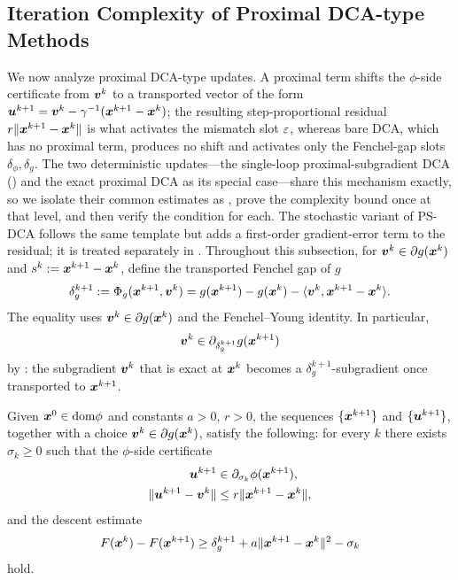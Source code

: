 \subsection{Iteration Complexity of Proximal DCA-type Methods}
\label{subsec:prox-subgrad-dca}
We now analyze proximal DCA-type updates. A proximal term shifts the
$\phi$-side certificate from $\bm{v}^k$ to a transported vector of the
form $\bm{u}^{k+1}=\bm{v}^k-\gamma^{-1}(\bm{x}^{k+1}-\bm{x}^k)$; the resulting
step-proportional residual $r\|\bm{x}^{k+1}-\bm{x}^k\|$ is what activates the
mismatch slot $\varepsilon$, whereas bare DCA, which has no proximal term,
produces no shift and activates only the Fenchel-gap slots
$\delta_\phi,\delta_g$. The two deterministic updates---the single-loop
proximal-subgradient DCA () and the exact proximal DCA
as its special case---share this mechanism exactly, so we isolate their
common estimates as , prove the
complexity bound once at that level, and then verify the condition for
each. The stochastic variant of PS-DCA follows the same template but
adds a first-order gradient-error term to the residual; it is treated
separately in .
Throughout this subsection, for
$\bm{v}^k\in\partial g(\bm{x}^k)$ and $s^k:=\bm{x}^{k+1}-\bm{x}^k$, define the
transported Fenchel gap of $g$
\begin{equation}
    \delta_g^{k+1}
    :=
    \Phi_g(\bm{x}^{k+1},\bm{v}^k)
    =
    g(\bm{x}^{k+1})-g(\bm{x}^k)
    -\langle \bm{v}^k,\bm{x}^{k+1}-\bm{x}^k\rangle .
    \label{eq:prox-dca-transport-g-gap}
\end{equation}
The equality uses $\bm{v}^k\in\partial g(\bm{x}^k)$ and the Fenchel--Young
identity. In particular,
\[
    \bm{v}^k\in\partial_{\delta_g^{k+1}} g(\bm{x}^{k+1})
\]
by : the subgradient $\bm{v}^k$ that is exact
at $\bm{x}^k$ becomes a $\delta_g^{k+1}$-subgradient once transported to
$\bm{x}^{k+1}$.

\begin{condition}
\label{cond:certified-prox-descent}
Given $\bm{x}^0\in\mathrm{dom}\phi$ and constants $a>0$, $r>0$, the sequences
$\{\bm{x}^{k+1}\}$ and $\{\bm{u}^{k+1}\}$, together with a choice
$\bm{v}^k\in\partial g(\bm{x}^k)$, satisfy the following: for every $k$ there
exists $\sigma_k\ge0$ such that the $\phi$-side
certificate
\begin{align}
    \bm{u}^{k+1}
    &\in
    \partial_{\sigma_k}\phi(\bm{x}^{k+1}),
    \label{eq:abstract-prox-phi-cert}
    \\
    \|\bm{u}^{k+1}-\bm{v}^k\|
    &\le
    r\|\bm{x}^{k+1}-\bm{x}^k\|,
    \label{eq:abstract-prox-dual-residual}
\end{align}
and the descent estimate
\begin{equation}
    F(\bm{x}^k)-F(\bm{x}^{k+1})
    \ge
    \delta_g^{k+1}
    +a\|\bm{x}^{k+1}-\bm{x}^k\|^2
    -\sigma_k
    \label{eq:abstract-prox-descent}
\end{equation}
hold.
\end{condition}

